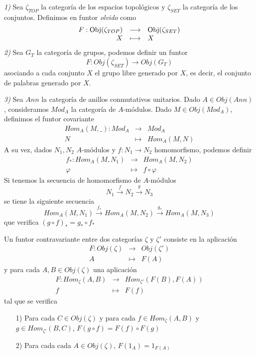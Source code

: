 \documentclass[../main.tex]{subfiles}
\begin{document}
\begin{example}
\textit{1)} Sea $\zeta_{TOP}$ la categoría de los espacios topológicos y $\zeta_{SET}$ la categoría de los conjuntos. Definimos en funtor \textit{olvido} como
$$
\begin{array}{rcl}
    F: \text{Obj}(\zeta_{TOP})&\longrightarrow&\text{Obj}(\zeta_{SET})\\
    X&\longmapsto&X
\end{array}
$$
\textit{2)} Sea $G_T$ la categoría de grupos, podemos definir un funtor$$F:Obj(\zeta_{SET})\longrightarrow Obj(G_T)$$ asociando a cada conjunto $X$ el grupo libre generado por $X$, es decir, el conjunto de palabras generado por $X$.

\textit{3)} Sea $Ann$ la categoría de anillos conmutativos unitarios. Dado $A\in Obj(Ann)$, consideramos $Mod_A$ la categoría de $A$-módulos. Dado $M\in Obj(Mod_A)$, definimos el funtor covariante
$$\begin{array}{rcl}
    Hom_A(M,\_):Mod_A&\longrightarrow&Mod_A\\
    N&\longmapsto&Hom_A(M,N)
    \end{array}$$
A su vez, dados $N_1, N_2$ $A$-módulos y $f:N_1\rightarrow N_2$ homomorfismo, podemos definir
$$\begin{array}{rcl}
    f_{\ast}:Hom_A(M,N_1)&\longrightarrow&Hom_A(M,N_2)\\
    \varphi&\longmapsto&f\circ\varphi
    \end{array}$$
Si tenemos la secuencia de homomorfismo de $A$-módulos $$N_1\overset{f}{\longrightarrow}N_2\overset{g}{\longrightarrow}N_3$$
se tiene la siguiente secuencia $$Hom_A(M,N_1)\overset{f_{\ast}}{\longrightarrow}Hom_A(M,N_2)\overset{g_{\ast}}{\longrightarrow}Hom_A(M,N_3)$$ que verifica $(g\circ f)_{\ast}=g_{\ast}\circ f_{\ast}$
\end{example}
\begin{definition} Un funtor contravariante entre dos categorías $\zeta$ y $\zeta '$ consiste en la aplicación
 $$\begin{array}{rcl}
    F: Obj(\zeta)&\longrightarrow&Obj(\zeta ')\\
    A&\longmapsto&F(A)
    \end{array}$$
y para cada $A,B\in Obj(\zeta)$ una aplicación
$$\begin{array}{rcl}
    F: Hom_{\zeta}(A,B)&\longrightarrow&Hom_{\zeta '}(F(B),F(A))\\
    f&\longmapsto&F(f)
    \end{array}$$
tal que se verifica \begin{itemize}
    \item [1)] Para cada $C\in Obj(\zeta)$ y para cada $f\in Hom_{\zeta}(A,B)$ y $g\in Hom_{\zeta '}(B,C)$, $F(g\circ f)=F(f)\circ F(g)$
    \item [2)] Para cada cada $A\in Obj(\zeta)$, $F(1_A)=1_{F(A)}$
\end{itemize}
\end{definition}
\end{document}
